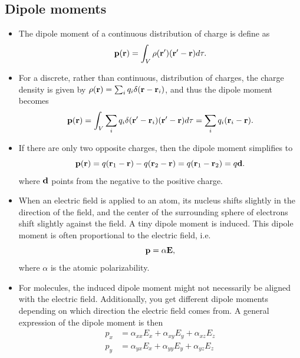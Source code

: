 \documentclass[a4paper,11pt]{report}
\begin{document}
\subsection{Dipole moments}
\begin{itemize}
    \item The dipole moment of a continuous distribution of charge is define as
    \begin{equation}
        \mathbf{p}(\mathbf{r}) = \int_V \rho(\mathbf{r}')(\mathbf{r}' - \mathbf{r}) d\tau.
    \end{equation}
    \item For a discrete, rather than continuous, distribution of charges, the charge density is given by $\rho(\mathbf{r}) = \sum_i q_i \delta(\mathbf{r} - \mathbf{r}_i)$, and thus the dipole moment becomes
    \begin{equation}
        \mathbf{p}(\mathbf{r}) = \int_V \sum_i q_i \delta(\mathbf{r}' - \mathbf{r}_i) (\mathbf{r}' - \mathbf{r}) d\tau = \sum_i q_i (\mathbf{r}_i - \mathbf{r}).
    \end{equation}
    \item If there are only two opposite charges, then the dipole moment simplifies to
    \begin{equation}
        \mathbf{p}(\mathbf{r}) = q (\mathbf{r}_1 - \mathbf{r}) - q(\mathbf{r}_2 - \mathbf{r}) = q (\mathbf{r}_1 - \mathbf{r}_2) = q \mathbf{d}.
    \end{equation}
    where $\mathbf{d}$ points from the negative to the positive charge.
    \item When an electric field is applied to an atom, its nucleus shifts slightly in the direction of the field, and the center of the surrounding sphere of electrons shift slightly against the field. A tiny dipole moment is induced. This dipole moment is often proportional to the electric field, i.e.
    \begin{equation}
        \mathbf{p} = \alpha \mathbf{E},
    \end{equation}
    where $\alpha$ is the atomic polarizability.
    \item For molecules, the induced dipole moment might not necessarily be aligned with the electric field. Additionally, you get different dipole moments depending on which direction the electric field comes from. A general expression of the dipole moment is then
    \begin{align}
         p_x &= \alpha_{xx} E_x + \alpha_{xy} E_y + \alpha_{xz} E_z \nonumber \\
         p_y &= \alpha_{yx} E_x + \alpha_{yy} E_y + \alpha_{yz} E_z\nonumber \\

\end{align}
\end{itemize}
\end{document}
